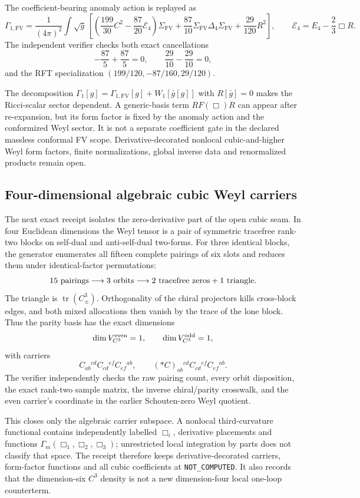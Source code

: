 \documentclass[11pt]{article}
\theoremstyle{definition}
\theoremstyle{remark}
\begin{document}
The coefficient-bearing anomaly action is replayed as
\[
 \Gamma_{1,\mathrm{FV}}=\frac1{(4\pi)^2}\int\!\sqrt g\,
 \left[\left(\frac{199}{30}C^2-\frac{87}{20}\mathcal E_4\right)
 \Sigma_{\mathrm{FV}}
 +\frac{87}{10}\Sigma_{\mathrm{FV}}\Delta_4\Sigma_{\mathrm{FV}}
 +\frac{29}{120}R^2\right],
 \qquad \mathcal E_4=E_4-\frac23\Box R.
\]
The independent verifier checks both exact cancellations
\[
 -\frac{87}{5}+\frac{87}{5}=0,
 \qquad
 \frac{29}{10}-\frac{29}{10}=0,
\]
and the RFT specialization
\((199/120,-87/160,29/120)\).

The decomposition
\(
 \Gamma_1[g]=\Gamma_{1,\mathrm{FV}}[g]+W_1[\bar g[g]]
\)
with \(R[\bar g]=0\) makes the Ricci-scalar sector dependent.  A generic-basis
term \(R F(\Box)R\) can appear after re-expansion, but its form factor is fixed
by the anomaly action and the conformized Weyl sector.  It is not a separate
coefficient gate in the declared massless conformal FV scope.  Derivative-decorated
nonlocal cubic-and-higher Weyl form factors, finite normalizations, global inverse data
and renormalized products remain open.

\subsection{Four-dimensional algebraic cubic Weyl carriers}

The next exact receipt isolates the zero-derivative part of the open cubic
seam.  In four Euclidean dimensions the Weyl tensor is a pair of symmetric
tracefree rank-two blocks on self-dual and anti-self-dual two-forms.  For
three identical blocks, the generator enumerates all fifteen complete
pairings of six slots and reduces them under identical-factor permutations:
\[
 15\ \hbox{pairings}\longrightarrow 3\ \hbox{orbits}
 \longrightarrow 2\ \hbox{tracefree zeros}+1\ \hbox{triangle}.
\]
The triangle is \(\operatorname{tr}(C_\pm^3)\).  Orthogonality of the chiral
projectors kills cross-block edges, and both mixed allocations then vanish by
the trace of the lone block.  Thus the parity basis has
the exact dimensions
\[
 \dim V_{C^3}^{\rm even}=1,
 \qquad
 \dim V_{C^3}^{\rm odd}=1,
\]
with carriers
\[
 C_{ab}{}^{cd}C_{cd}{}^{ef}C_{ef}{}^{ab},
 \qquad
 ({*C})_{ab}{}^{cd}C_{cd}{}^{ef}C_{ef}{}^{ab}.
\]
The verifier independently checks the raw pairing count, every orbit
disposition, the exact rank-two sample matrix, the inverse chiral/parity
crosswalk, and the even carrier's coordinate in the earlier Schouten-zero
Weyl quotient.

This closes only the algebraic carrier subspace.  A nonlocal third-curvature
functional contains independently labelled \(\Box_i\), derivative
placements and functions \(\Gamma_m(\Box_1,\Box_2,\Box_3)\); unrestricted
local integration by parts does not classify that space.  The receipt
therefore keeps derivative-decorated carriers, form-factor functions and all
cubic coefficients at \texttt{NOT\_COMPUTED}.  It also records that the
dimension-six \(C^3\) density is not a new dimension-four local one-loop
counterterm.
\end{document}
